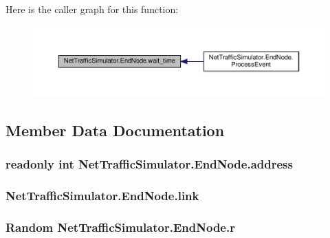 Here is the caller graph for this function\-:\nopagebreak
\begin{figure}[H]
\begin{center}
\leavevmode
\includegraphics[width=350pt]{classNetTrafficSimulator_1_1EndNode_a9287a628dea98e2611bde679eb3c63da_icgraph}
\end{center}
\end{figure}




\subsection{Member Data Documentation}
\hypertarget{classNetTrafficSimulator_1_1EndNode_a84d0df6c9c755c895dffff6a531823d2}{
\subsubsection[{address}]{\setlength{\rightskip}{0pt plus 5cm}readonly int Net\-Traffic\-Simulator.\-End\-Node.\-address\hspace{0.3cm}{\ttfamily [private]}}}\label{classNetTrafficSimulator_1_1EndNode_a84d0df6c9c755c895dffff6a531823d2}
\hypertarget{classNetTrafficSimulator_1_1EndNode_a3fde207ff4a49bafd01df2e89fff7d11}{
\subsubsection[{link}]{ Net\-Traffic\-Simulator.\-End\-Node.\-link\hspace{0.3cm}{\ttfamily [private]}}}\label{classNetTrafficSimulator_1_1EndNode_a3fde207ff4a49bafd01df2e89fff7d11}
\hypertarget{classNetTrafficSimulator_1_1EndNode_ab68702887e7cdb3933a3a006ea508a76}{
\subsubsection[{r}]{\setlength{\rightskip}{0pt plus 5cm}Random Net\-Traffic\-Simulator.\-End\-Node.\-r\hspace{0.3cm}{\ttfamily [private]}}}\label{classNetTrafficSimulator_1_1EndNode_ab68702887e7cdb3933a3a006ea508a76}
